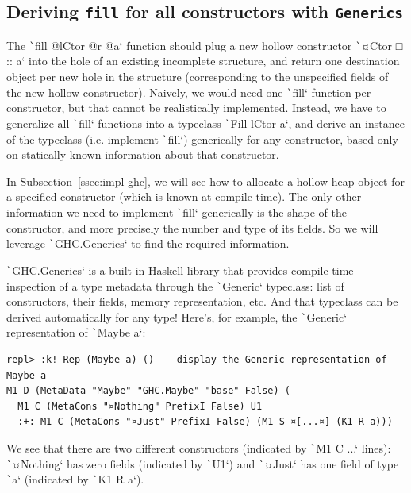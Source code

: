 \documentclass[english]{jflart}
\newlength{\currentparskip}
\newenvironment{unbreakable}
{%
  \setlength{\currentparskip}{\parskip}%
  \setlength{\parskip}{\currentparskip}%
  \par\vspace{0.5\baselineskip}%
  \noindent\begin{minipage}{\textwidth}%
    \setlength{\parskip}{\currentparskip}%
}
{%
  \end{minipage}%
  \par\vspace{0.5\baselineskip}%
}
\begin{document}
\subsection{Deriving \texttt{fill} for all constructors with \texttt{Generics}}\label{ssec:impl-generics}

The \texttt`fill @lCtor @r @a` function should plug a new hollow constructor \texttt`¤Ctor □ :: a` into the hole of an existing incomplete structure, and return one destination object per new hole in the structure (corresponding to the unspecified fields of the new hollow constructor). Naively, we would need one \texttt`fill` function per constructor, but that cannot be realistically implemented. Instead, we have to generalize all \texttt`fill` functions into a typeclass \texttt`Fill lCtor a`, and derive an instance of the typeclass (i.e. implement \texttt`fill`) generically for any constructor, based only on statically-known information about that constructor.

In Subsection~\ref{ssec:impl-ghc}, we will see how to allocate a hollow heap object for a specified constructor (which is known at compile-time). The only other information we need to implement \texttt`fill` generically is the shape of the constructor, and more precisely the number and type of its fields. So we will leverage \texttt`GHC.Generics` to find the required information.

\texttt`GHC.Generics` is a built-in Haskell library that provides compile-time inspection of a type metadata through the \texttt`Generic` typeclass: list of constructors, their fields, memory representation, etc. And that typeclass can be derived automatically for any type! Here's, for example, the \texttt`Generic` representation of \texttt`Maybe a`:

\begin{unbreakable}
{\small
\begin{verbatim}
repl> :k! Rep (Maybe a) () -- display the Generic representation of Maybe a
M1 D (MetaData "Maybe" "GHC.Maybe" "base" False) (
  M1 C (MetaCons "¤Nothing" PrefixI False) U1
  :+: M1 C (MetaCons "¤Just" PrefixI False) (M1 S ¤[...¤] (K1 R a)))
\end{verbatim}
}
\end{unbreakable}

We see that there are two different constructors (indicated by \texttt`M1 C ...` lines): \texttt`¤Nothing` has zero fields (indicated by \texttt`U1`) and \texttt`¤Just` has one field of type \texttt`a` (indicated by \texttt`K1 R a`).
\end{document}
